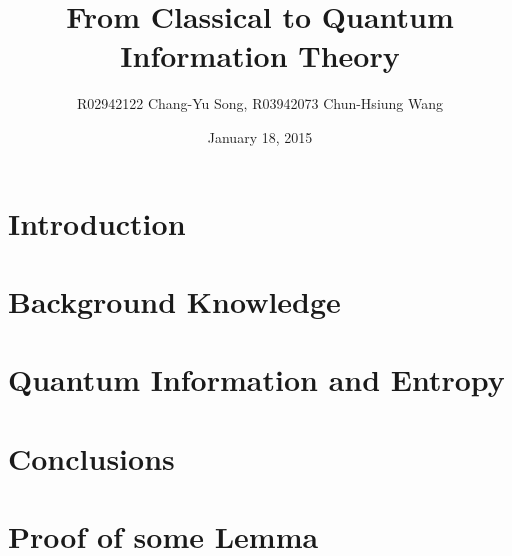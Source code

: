 \documentclass[12pt]{article}
\title{From Classical to Quantum Information Theory}
\author{R02942122 Chang-Yu Song,
        R03942073 Chun-Hsiung Wang}
\date{January 18, 2015}
\begin{document}
\maketitle

\thispagestyle{fancyplain}

\begin{abstract}

\end{abstract}

\section{Introduction}\label{sec:Intro}


\section{Background Knowledge}\label{sec:Background}


\section{Quantum Information and Entropy}\label{sec:QuantumInfo}




%
%

\section{Conclusions}\label{sec:Conclusion}






\appendix
\section{Proof of some Lemma}



\end{document}

